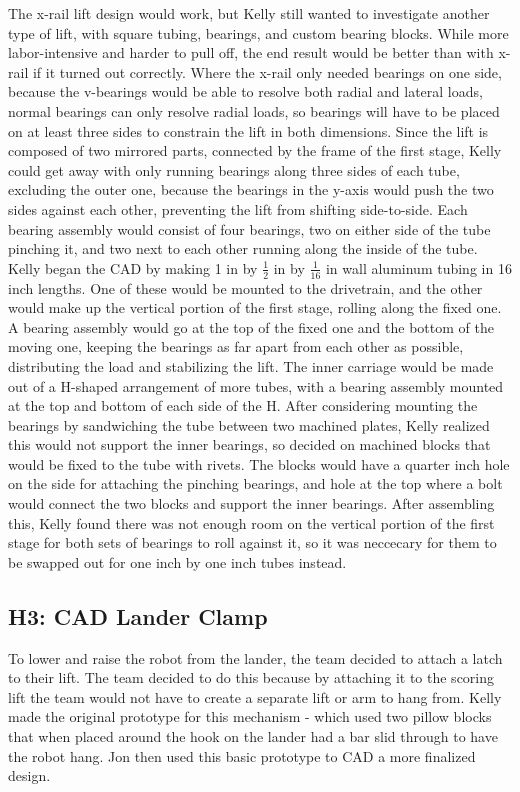 \documentclass{article}
\begin{document}
The x-rail lift design would work, but Kelly still wanted to investigate another type of lift, with square tubing, bearings, and custom bearing blocks. While more labor-intensive and harder to pull off, the end result would be better than with x-rail if it turned out correctly. Where the x-rail only needed bearings on one side, because the v-bearings would be able to resolve both radial and lateral loads, normal bearings can only resolve radial loads, so bearings will have to be placed on at least three sides to constrain the lift in both dimensions. Since the lift is composed of two mirrored parts, connected by the frame of the first stage, Kelly could get away with only running bearings along three sides of each tube, excluding the outer one, because the bearings in the y-axis would push the two sides against each other, preventing the lift from shifting side-to-side. Each bearing assembly would consist of four bearings, two on either side of the tube pinching it, and two next to each other running along the inside of the tube. Kelly began the CAD by making 1 in by $\frac{1}{2}$ in by $\frac{1}{16}$ in wall aluminum tubing in 16 inch lengths. One of these would be mounted to the drivetrain, and the other would make up the vertical portion of the first stage, rolling along the fixed one. A bearing assembly would go at the top of the fixed one and the bottom of the moving one, keeping the bearings as far apart from each other as possible, distributing the load and stabilizing the lift. The inner carriage would be made out of a H-shaped arrangement of more tubes, with a bearing assembly mounted at the top and bottom of each side of the H. After considering mounting the bearings by sandwiching the tube between two machined plates, Kelly realized this would not support the inner bearings, so decided on machined blocks that would be fixed to the tube with rivets. The blocks would have a quarter inch hole on the side for attaching the pinching bearings, and hole at the top where a bolt would connect the two blocks and support the inner bearings. After assembling this, Kelly found there was not enough room on the vertical portion of the first stage for both sets of bearings to roll against it, so it was neccecary for them to be swapped out for one inch by one inch tubes instead. 

\subsection{H3: CAD Lander Clamp}

To lower and raise the robot from the lander, the team decided to attach a latch to their lift. The team decided to do this because by attaching it to the scoring lift the team would not have to create a separate lift or arm to hang from. Kelly made the original prototype for this mechanism - which used two pillow blocks that when placed around the hook on the lander had a bar slid through to have the robot hang. Jon then used this basic prototype to CAD a more finalized design.
\end{document}
